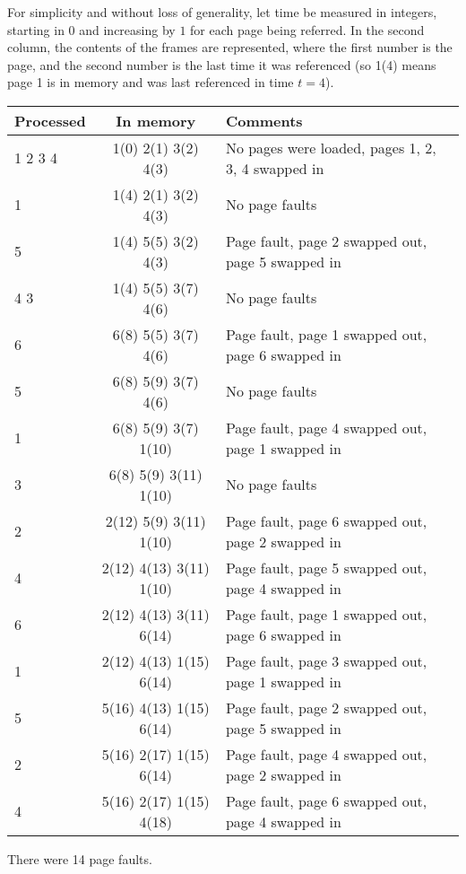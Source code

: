 \documentclass{sope}
\begin{document}
{
For simplicity and without loss of generality, let time be measured in integers, starting in $0$ and increasing by $1$ for each page being referred. In the second column, the contents of the frames are represented, where the first number is the page, and the second number is the last time it was referenced (so 1(4) means page 1 is in memory and was last referenced in time $t=4$).
\begin{center}
\begin{tabular}{l | c | l}
    \textbf{Processed} & \textbf{In memory} & \textbf{Comments} \\ \hline
    1 2 3 4            & 1(0) 2(1) 3(2) 4(3)     & No pages were loaded, pages 1, 2, 3, 4 swapped in \\
    1                  & 1(4) 2(1) 3(2) 4(3)     & No page faults \\
    5                  & 1(4) 5(5) 3(2) 4(3)     & Page fault, page 2 swapped out, page 5 swapped in \\
    4 3                & 1(4) 5(5) 3(7) 4(6)     & No page faults \\
    6                  & 6(8) 5(5) 3(7) 4(6)     & Page fault, page 1 swapped out, page 6 swapped in \\
    5                  & 6(8) 5(9) 3(7) 4(6)     & No page faults \\
    1                  & 6(8) 5(9) 3(7) 1(10)    & Page fault, page 4 swapped out, page 1 swapped in \\
    3                  & 6(8) 5(9) 3(11) 1(10)   & No page faults \\
    2                  & 2(12) 5(9) 3(11) 1(10)  & Page fault, page 6 swapped out, page 2 swapped in \\
    4                  & 2(12) 4(13) 3(11) 1(10) & Page fault, page 5 swapped out, page 4 swapped in \\
    6                  & 2(12) 4(13) 3(11) 6(14) & Page fault, page 1 swapped out, page 6 swapped in \\
    1                  & 2(12) 4(13) 1(15) 6(14) & Page fault, page 3 swapped out, page 1 swapped in \\
    5                  & 5(16) 4(13) 1(15) 6(14) & Page fault, page 2 swapped out, page 5 swapped in \\
    2                  & 5(16) 2(17) 1(15) 6(14) & Page fault, page 4 swapped out, page 2 swapped in \\
    4                  & 5(16) 2(17) 1(15) 4(18) & Page fault, page 6 swapped out, page 4 swapped in
\end{tabular}
\end{center}
There were 14 page faults.

}
\end{document}
